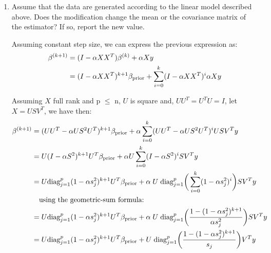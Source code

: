 \documentclass[12pt,twoside]{article}
\begin{document}
\begin{enumerate}
\begin{enumerate}
    \item Assume that the data are generated according to the linear model described above. Does the modification change the mean or the covariance matrix of the estimator? If so, report the new value.\\
    
\medskip

Assuming constant step size, we can express the previous expression as:
\begin{align*}
		\beta^{(k+1)}	&=	( I - \alpha X X^T ) \beta^{(k)} +  \alpha X y \\
					&=	(I - \alpha X X^T)^{k+1} \beta_{\operatorname{prior}}	+ \sum_{i=0}^k (I - \alpha X X^T)^i \alpha X y 
\end{align*}

Assuming $X$ full rank and p $\le$ n, $U$ is square and, $UU^T = U^TU = I$, let $X = USV^T$, we have then:
\begin{align*}
		\beta^{(k+1)}	&=	(UU^T - \alpha US^2 U^T)^{k+1} \beta_{\operatorname{prior}}	+ \alpha \sum_{i=0}^k      (UU^T - \alpha US^2U^T)^i U S V^T y \\
					&=    U (I - \alpha S^2)^{k+1}  U^T  \beta_{\operatorname{prior}}		+ \alpha U \sum_{i=0}^k  (I - \alpha S^2)^i S V^T y \\
					&=	U \text{diag}_{j=1}^p  (1 - \alpha s_j^2)^{k+1} U^T   \beta_{\operatorname{prior}} + \alpha \; U  \;  \text{diag}_{j=1}^p \bigg( \sum_{i=0}^k (1 - \alpha s_j^2 )^i \bigg)  S V^T y \\
					& \text{ ~ using the geometric-sum formula: } \\
					&= 	U \text{diag}_{j=1}^p  (1 - \alpha s_j^2)^{k+1} U^T   \beta_{\operatorname{prior}} + \alpha \; U  \;  \text{diag}_{j=1}^p \bigg( \frac{ 1 - (1 - \alpha s_j^2 )^{k+1}} {\alpha s_j^2} \bigg)  S V^T y \\
					&=    U \text{diag}_{j=1}^p  (1 - \alpha s_j^2)^{k+1} U^T   \beta_{\operatorname{prior}} + U  \;  \text{diag}_{j=1}^p \bigg( \frac{ 1 - (1 - \alpha s_j^2 )^{k+1}} {s_j} \bigg)  V^T y \\
\end{align*}


\end{enumerate}
\end{enumerate}
\end{document}
